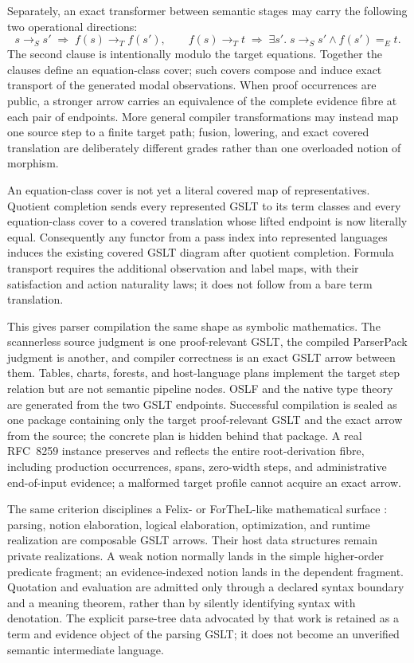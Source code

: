 \documentclass[11pt]{article}
\theoremstyle{definition}
\theoremstyle{remark}
\begin{document}
Separately, an exact transformer between semantic stages may carry the
following two operational directions:
\[
  s\longrightarrow_S s' \;\Longrightarrow\;
    f(s)\longrightarrow_T f(s'),
  \qquad
  f(s)\longrightarrow_T t \;\Longrightarrow\;
    \exists s'.\;s\longrightarrow_S s'\land f(s')=_E t.
\]
The second clause is intentionally modulo the target equations.  Together the
clauses define an equation-class cover; such covers compose and induce exact
transport of the generated modal observations.  When proof occurrences are
public, a stronger arrow carries an equivalence of the complete evidence fibre
at each pair of endpoints.  More general compiler transformations may instead
map one source step to a finite target path; fusion, lowering, and exact covered
translation are deliberately different grades rather than one overloaded
notion of morphism.

An equation-class cover is not yet a literal covered map of representatives.
Quotient completion sends every represented GSLT to its term classes and every
equation-class cover to a covered translation whose lifted endpoint is now
literally equal.  Consequently any functor from a pass index into represented
languages induces the existing covered GSLT diagram after quotient completion.
Formula transport requires the additional observation and label maps, with
their satisfaction and action naturality laws; it does not follow from a bare
term translation.

This gives parser compilation the same shape as symbolic mathematics.  The
scannerless source judgment is one proof-relevant GSLT, the compiled ParserPack
judgment is another, and compiler correctness is an exact GSLT arrow between
them.  Tables, charts, forests, and host-language plans implement the target
step relation but are not semantic pipeline nodes.  OSLF and the native type
theory are generated from the two GSLT endpoints.  Successful compilation is
sealed as one package containing only the target proof-relevant GSLT and the
exact arrow from the source; the concrete plan is hidden behind that package.
A real RFC~8259 instance
preserves and reflects the entire root-derivation fibre, including production
occurrences, spans, zero-width steps, and administrative end-of-input evidence;
a malformed target profile cannot acquire an exact arrow.

The same criterion disciplines a Felix- or ForTheL-like mathematical surface
\cite{KoepkeDeLonLorenzenForTheL}: parsing, notion elaboration, logical
elaboration, optimization, and runtime realization are composable GSLT arrows.
Their host data structures remain private realizations.  A weak notion normally
lands in the simple higher-order predicate fragment; an evidence-indexed notion
lands in the dependent fragment.  Quotation and evaluation are admitted only
through a declared syntax boundary and a meaning theorem, rather than by
silently identifying syntax with denotation.  The explicit parse-tree data
advocated by that work is retained as a term and evidence object of the parsing
GSLT; it does not become an unverified semantic intermediate language.
\end{document}

